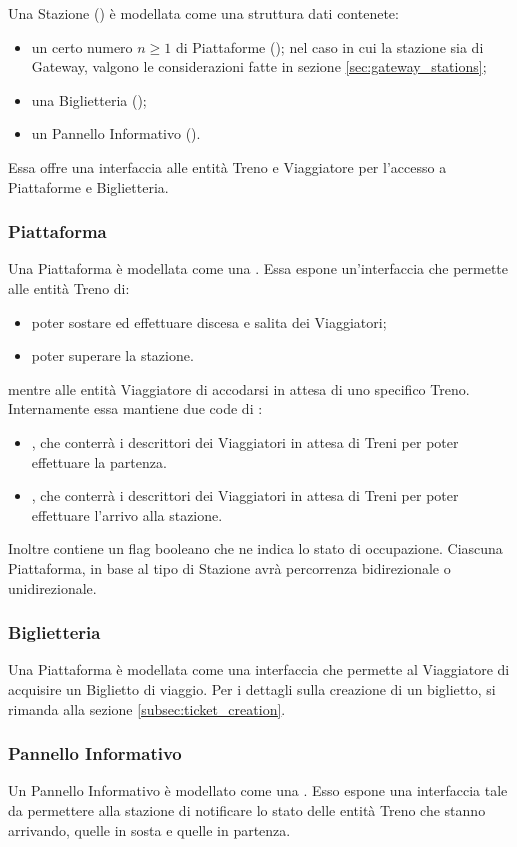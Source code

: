 	Una Stazione () è modellata come una struttura dati contenete:
		\begin{itemize}
			\item un certo numero $ n \ge 1$ di Piattaforme (); nel caso in cui la stazione sia di Gateway, valgono le considerazioni fatte in sezione \ref{sec:gateway_stations};
			\item una Biglietteria ();
			\item un Pannello Informativo ().
		\end{itemize}
	Essa offre una interfaccia alle entità Treno e Viaggiatore per l'accesso a Piattaforme e Biglietteria.
		
		\subsubsection{Piattaforma}
	
		Una Piattaforma è modellata come una . Essa espone un'interfaccia che permette alle entità Treno di:
		\begin{itemize}
			\item poter sostare ed effettuare discesa e salita dei Viaggiatori;
			\item poter superare la stazione.
		\end{itemize}
	mentre alle entità Viaggiatore di accodarsi in attesa di uno specifico Treno.
		Internamente essa mantiene due code di :
		\begin{itemize}
			\item {}, che conterrà i descrittori dei Viaggiatori in attesa di Treni per poter effettuare la partenza.
			\item {}, che conterrà i descrittori dei Viaggiatori in attesa di Treni per poter effettuare l'arrivo alla stazione.
		\end{itemize}
		Inoltre contiene un flag booleano  che ne indica lo stato di occupazione.
		Ciascuna Piattaforma, in base al tipo di Stazione avrà percorrenza bidirezionale o unidirezionale.
				
		\subsubsection{Biglietteria}
		
		Una Piattaforma è modellata come una interfaccia che permette al Viaggiatore di acquisire un Biglietto di viaggio. Per i dettagli sulla creazione di un biglietto, si rimanda alla sezione \ref{subsec:ticket_creation}. 
		
		\subsubsection{Pannello Informativo}
		
		Un Pannello Informativo è modellato come una . Esso espone una interfaccia tale da permettere alla stazione di notificare lo stato delle entità Treno che stanno arrivando, quelle in sosta e quelle in partenza.
\newpage
